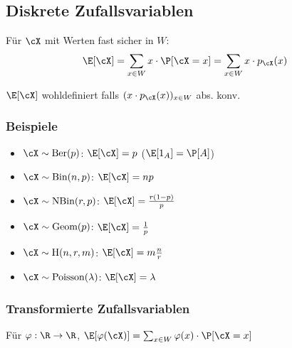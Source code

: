 \subsection{Diskrete Zufallsvariablen}
\shorttheorem Für $\cX$ mit Werten fast sicher in $W$:
\[
    \E[\cX] = \sum_{x \in W} x \cdot \P[\cX = x] = \sum_{x \in W} x \cdot p_\cX(x)
\]

\shortremark $\E[\cX]$ wohldefiniert falls $(x \cdot p_\cX(x))_{x \in W}$ abs. konv.

\subsubsection{Beispiele}
\begin{itemize}
    \item $\cX \sim \text{Ber}(p)$: $\E[\cX] = p$ ($\E[1_A] = \P[A]$)
    \item $\cX \sim \text{Bin}(n, p)$: $\E[\cX] = np$
    \item $\cX \sim \text{NBin}(r, p)$: $\E[\cX] = \frac{r(1 - p)}{p}$
    \item $\cX \sim \text{Geom}(p)$: $\E[\cX] = \frac{1}{p}$
    \item $\cX \sim \text{H}(n, r, m)$: $\E[\cX] = m\frac{n}{r}$
    \item $\cX \sim \text{Poisson}(\lambda)$: $\E[\cX] = \lambda$
\end{itemize}


\subsubsection{Transformierte Zufallsvariablen}
\shorttheorem Für $\varphi : \R \rightarrow \R$, $\E[\varphi(\cX)] = \sum_{x \in W} \varphi(x) \cdot \P[\cX = x]$
